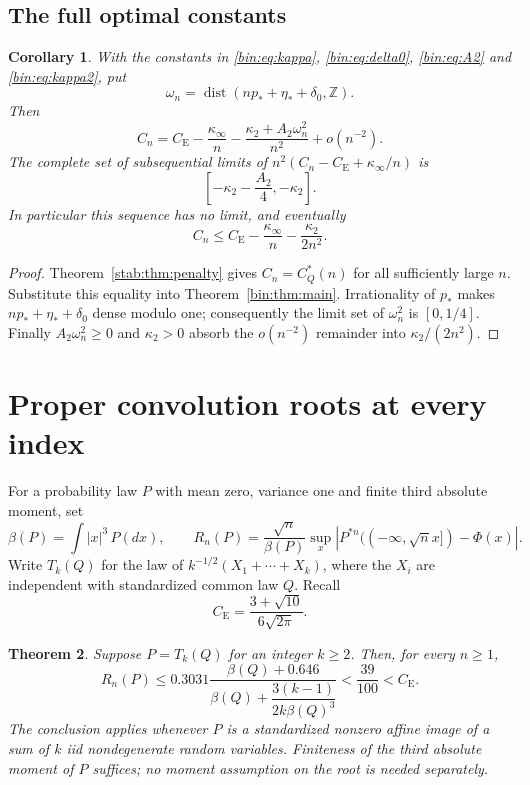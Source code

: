 \documentclass[11pt,a4paper]{article}
\numberwithin{equation}{section}
\newtheorem{theorem}{Theorem}[section]
\newtheorem{corollary}[theorem]{Corollary}
\theoremstyle{definition}
\theoremstyle{remark}
\newcommand{\Z}{\mathbb Z}
\newcommand{\CE}{C_{\mathrm E}}
\DeclareMathOperator{\dist}{dist}
\begin{document}
\subsection{The full optimal constants}
\begin{corollary}\label{main:full-second-order}
With the constants in \eqref{bin:eq:kappa},
\eqref{bin:eq:delta0}, \eqref{bin:eq:A2} and \eqref{bin:eq:kappa2},
put
\[
 \omega_n=\dist(np_*+\eta_*+\delta_0,\Z).
\]
Then
\[
 C_n=C_{\mathrm E}-\frac{\kappa_\infty}{n}
 -\frac{\kappa_2+A_2\omega_n^2}{n^2}+o(n^{-2}).
\]
The complete set of subsequential limits of
\(n^2(C_n-C_{\mathrm E}+\kappa_\infty/n)\) is
\[
 \left[-\kappa_2-\frac{A_2}{4},-\kappa_2\right].
\]
In particular this sequence has no limit, and eventually
\[
 C_n\le C_{\mathrm E}-\frac{\kappa_\infty}{n}
                       -\frac{\kappa_2}{2n^2}.
\]
\end{corollary}
\begin{proof}
Theorem~\ref{stab:thm:penalty} gives \(C_n=C_Q^*(n)\) for all
sufficiently large \(n\). Substitute this equality into
Theorem~\ref{bin:thm:main}. Irrationality of \(p_*\) makes
\(np_*+\eta_*+\delta_0\) dense modulo one; consequently the limit
set of \(\omega_n^2\) is \([0,1/4]\). Finally
\(A_2\omega_n^2\ge0\) and \(\kappa_2>0\) absorb the \(o(n^{-2})\)
remainder into \(\kappa_2/(2n^2)\).
\end{proof}

\section{Proper convolution roots at every index}\label{conv:section}
For a probability law $P$ with mean zero, variance one and finite third
absolute moment, set
\[
 \beta(P)=\int |x|^3\,P(dx),\qquad
 R_n(P)=\frac{\sqrt n}{\beta(P)}
 \sup_x\left|P^{*n}(({-\infty},\sqrt n x])-\Phi(x)\right|.
\]
Write $T_k(Q)$ for the law of $k^{-1/2}(X_1+\cdots+X_k)$, where the
$X_i$ are independent with standardized common law $Q$. Recall
\[
 \CE=\frac{3+\sqrt{10}}{6\sqrt{2\pi}}.
\]

\begin{theorem}\label{conv:thm:root}
Suppose $P=T_k(Q)$ for an integer $k\ge2$. Then, for every $n\ge1$,
\begin{equation}\label{conv:eq:main}
 R_n(P)\le
 0.3031\frac{\beta(Q)+0.646}
 {\beta(Q)+\dfrac{3(k-1)}{2k\beta(Q)^3}}
 <\frac{39}{100}<\CE.
\end{equation}
The conclusion applies whenever $P$ is a standardized nonzero affine
image of a sum of $k$ iid nondegenerate random variables. Finiteness of
the third absolute moment of $P$ suffices; no moment assumption on the
root is needed separately.
\end{theorem}
\end{document}
